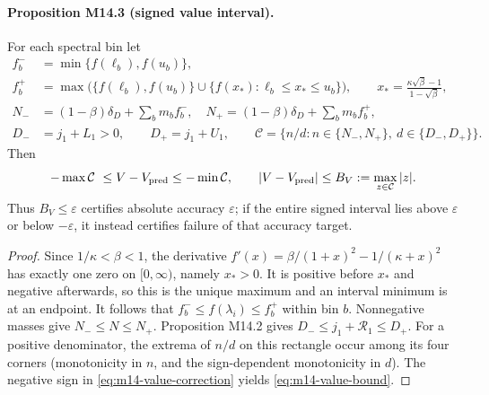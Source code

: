 \paragraph{Proposition M14.3 (signed value interval).}
For each spectral bin let
\begin{align}
 f_b^-&=\min\{f(\ell_b),f(u_b)\},\\
 f_b^+&=\max\bigl(\{f(\ell_b),f(u_b)\}
               \cup\{f(x_*):\ell_b\leq x_*\leq u_b\}\bigr),\qquad
 x_* = \frac{\kappa\sqrt\beta-1}{1-\sqrt\beta},\\
 N_-&=(1-\beta)\delta_D+\sum_b m_b f_b^-,\quad
 N_+=(1-\beta)\delta_D+\sum_b m_b f_b^+,\\
 D_-&=j_1+L_1>0,\qquad D_+=j_1+U_1,\qquad
 \mathcal C=\{n/d:n\in\{N_-,N_+\},\ d\in\{D_-,D_+\}\}.
 \label{eq:m14-value-interval}
\end{align}
Then
\begin{equation}
 -\max\mathcal C\ \leq V-V_{\rm pred}\leq-\min\mathcal C,
 \qquad |V-V_{\rm pred}|\leq
 B_V:=\max_{z\in\mathcal C}|z|.
 \label{eq:m14-value-bound}
\end{equation}
Thus $B_V\leq\varepsilon$ certifies absolute accuracy $\varepsilon$;
if the entire signed interval lies above $\varepsilon$ or below
$-\varepsilon$, it instead certifies failure of that accuracy target.

\begin{proof}
Since $1/\kappa<\beta<1$, the derivative
$f'(x)=\beta/(1+x)^2-1/(\kappa+x)^2$ has exactly one zero on
$[0,\infty)$, namely $x_*>0$.  It is positive before $x_*$ and negative
afterwards, so this is the unique maximum and an interval minimum is at an
endpoint.  It follows that $f_b^-\leq f(\lambda_i)\leq f_b^+$ within bin $b$.
Nonnegative masses give $N_-\leq N\leq N_+$.
Proposition M14.2 gives $D_-\leq j_1+\mathcal R_1\leq D_+$.
For a positive denominator, the extrema of $n/d$ on this rectangle occur
among its four corners (monotonicity in $n$, and the sign-dependent
monotonicity in $d$).  The negative sign in
\eqref{eq:m14-value-correction} yields \eqref{eq:m14-value-bound}.
\end{proof}

